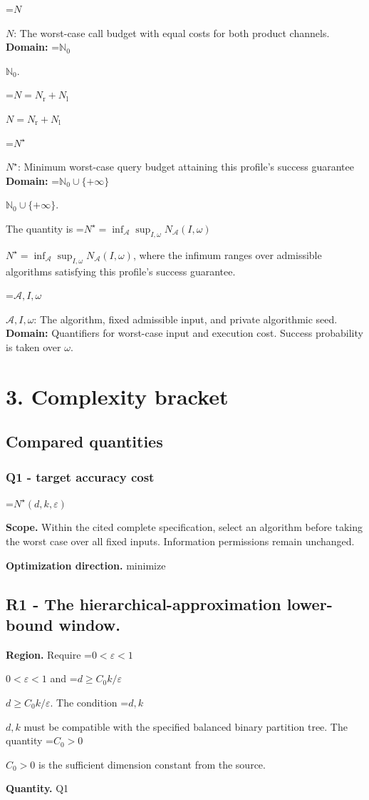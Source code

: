 \documentclass[10pt,a4paper]{article}
\newcommand{\AtlasMath}[1]{\par\begingroup\centering\setbox0=\hbox{$\displaystyle #1$}\ifdim\wd0>1.4\linewidth\typeout{ATLAS WIDE FORMULA: \the\wd0}\fi\ifdim\wd0>\linewidth\resizebox{\linewidth}{!}{\box0}\else\box0\fi\par\endgroup}
\newcommand{\AtlasInlineMath}[1]{\begingroup\setbox0=\hbox{$#1$}\ifdim\wd0>.4\linewidth\endgroup\AtlasMath{#1}\else\endgroup$#1$\fi}
\begin{document}
\AtlasInlineMath{N}: The worst-case call budget with equal costs for both product channels. \textbf{Domain:} \AtlasInlineMath{\mathbb N_0}.

\AtlasInlineMath{N=N_{\mathrm r}+N_{\mathrm l}}

\AtlasInlineMath{N^\star}: Minimum worst-case query budget attaining this profile's success guarantee \textbf{Domain:} \AtlasInlineMath{\mathbb N_0\cup\{+\infty\}}.

The quantity is \AtlasInlineMath{N^\star=\inf_{\mathcal A}\sup_{I,\omega}N_{\mathcal A}(I,\omega)}, where the infimum ranges over admissible algorithms satisfying this profile's success guarantee.

\AtlasInlineMath{\mathcal A,I,\omega}: The algorithm, fixed admissible input, and private algorithmic seed. \textbf{Domain:} Quantifiers for worst-case input and execution cost. Success probability is taken over $\omega$.

\section{3. Complexity bracket}
\subsection{Compared quantities}
\subsubsection{Q1 - target accuracy cost}
\AtlasMath{N^\star(d,k,\varepsilon)}
\textbf{Scope.} Within the cited complete specification, select an algorithm before taking the worst case over all fixed inputs. Information permissions remain unchanged.

\textbf{Optimization direction.} minimize

\subsection{R1 - The hierarchical-approximation lower-bound window.}
\textbf{Region.} Require \AtlasInlineMath{0<\varepsilon<1} and \AtlasInlineMath{d\ge C_0k/\varepsilon}. The condition \AtlasInlineMath{d,k} must be compatible with the specified balanced binary partition tree. The quantity \AtlasInlineMath{C_0>0} is the sufficient dimension constant from the source.

\textbf{Quantity.} Q1
\end{document}
